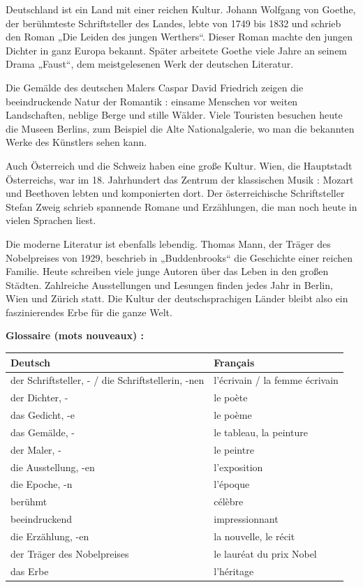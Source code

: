\documentclass[11pt]{article}
\begin{document}
\begin{textebox}
Deutschland ist ein Land mit einer reichen Kultur. Johann Wolfgang von Goethe, der berühmteste Schriftsteller des Landes, lebte von 1749 bis 1832 und schrieb den Roman „Die Leiden des jungen Werthers“. Dieser Roman machte den jungen Dichter in ganz Europa bekannt. Später arbeitete Goethe viele Jahre an seinem Drama „Faust“, dem meistgelesenen Werk der deutschen Literatur.

Die Gemälde des deutschen Malers Caspar David Friedrich zeigen die beeindruckende Natur der Romantik : einsame Menschen vor weiten Landschaften, neblige Berge und stille Wälder. Viele Touristen besuchen heute die Museen Berlins, zum Beispiel die Alte Nationalgalerie, wo man die bekannten Werke des Künstlers sehen kann.

Auch Österreich und die Schweiz haben eine große Kultur. Wien, die Hauptstadt Österreichs, war im 18. Jahrhundert das Zentrum der klassischen Musik : Mozart und Beethoven lebten und komponierten dort. Der österreichische Schriftsteller Stefan Zweig schrieb spannende Romane und Erzählungen, die man noch heute in vielen Sprachen liest.

Die moderne Literatur ist ebenfalls lebendig. Thomas Mann, der Träger des Nobelpreises von 1929, beschrieb in „Buddenbrooks“ die Geschichte einer reichen Familie. Heute schreiben viele junge Autoren über das Leben in den großen Städten. Zahlreiche Ausstellungen und Lesungen finden jedes Jahr in Berlin, Wien und Zürich statt. Die Kultur der deutschsprachigen Länder bleibt also ein faszinierendes Erbe für die ganze Welt.
\end{textebox}

\textbf{Glossaire (mots nouveaux) :}

\begin{center}
\begin{tabularx}{\linewidth}{|X|X|}
\hline
\rowcolor{popblueL} \textbf{Deutsch} & \textbf{Français} \\
\hline
der Schriftsteller, - / die Schriftstellerin, -nen & l'écrivain / la femme écrivain \\
\hline
der Dichter, - & le poète \\
\hline
das Gedicht, -e & le poème \\
\hline
das Gemälde, - & le tableau, la peinture \\
\hline
der Maler, - & le peintre \\
\hline
die Ausstellung, -en & l'exposition \\
\hline
die Epoche, -n & l'époque \\
\hline
berühmt & célèbre \\
\hline
beeindruckend & impressionnant \\
\hline
die Erzählung, -en & la nouvelle, le récit \\
\hline
der Träger des Nobelpreises & le lauréat du prix Nobel \\
\hline
das Erbe & l'héritage \\
\hline
\end{tabularx}
\end{center}
\end{document}
